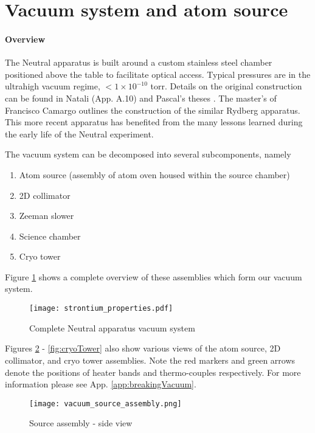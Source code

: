 \section{Vacuum system and atom source} \label{sec:vac}
\setcounter{footnote}{0}
\paragraph{Overview}
	
The Neutral apparatus is built around a custom stainless steel chamber positioned above the table to facilitate optical access. Typical pressures are in the ultrahigh vacuum regime, $<1\times10^{-10}$ torr. 
Details on the original construction can be found in Natali (App. A.10) and Pascal's theses \cite{MartinezdeEscolar2010,Mickelson2010b}. The master's of Francisco Camargo \cite{Camargo2015} outlines the construction of the similar Rydberg apparatus. This more recent apparatus has benefited from the many lessons learned during the early life of the Neutral experiment.
\newline

\noindent The vacuum system can be decomposed into several subcomponents, namely
\begin{enumerate}
\item Atom source (assembly of atom oven housed within the source chamber)
\item 2D collimator
\item Zeeman slower
\item Science chamber
\item Cryo tower
\end{enumerate}
Figure \ref{fig:vacuumSystem} shows a complete overview of these assemblies which form our vacuum system.
	\begin{figure} 
		\centerline{
		\texttt{[image: strontium\_properties.pdf]}}
		\caption{Complete Neutral apparatus vacuum system}
		\label{fig:vacuumSystem}
	\end{figure}
Figures \ref{fig:sourceSideView} - \ref{fig:cryoTower} also show various views of the atom source, 2D collimator, and cryo tower assemblies. Note the red markers and green arrows denote the positions of heater bands and thermo-couples respectively. For more information please see App. \ref{app:breakingVacuum}.
	\begin{figure} 
		\centerline{
		\texttt{[image: vacuum\_source\_assembly.png]}}
		\caption{Source assembly - side view}
		\label{fig:sourceSideView}
	\end{figure}
	
